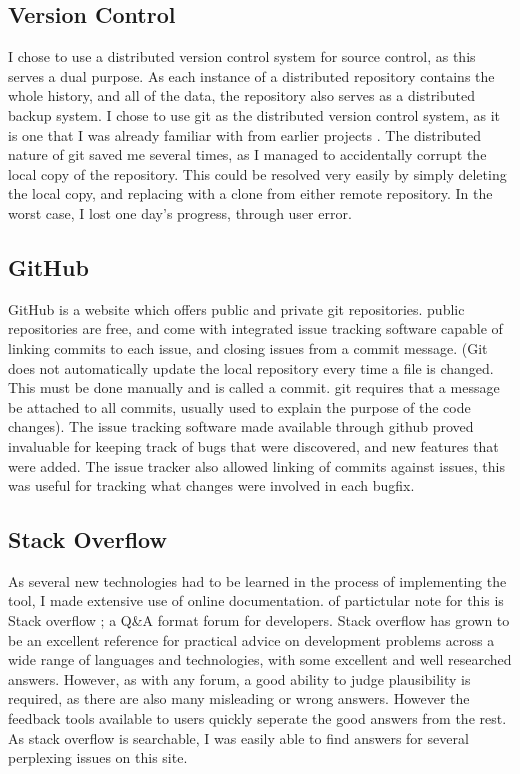 \subsection{Version Control}
I chose to use a distributed version control system for source control, as this serves a dual purpose. As each instance of a distributed repository contains the whole history, and all of the data, the repository also serves as a distributed backup system. 
I chose to use git as the distributed version control system, as it is one that I was already familiar with from earlier projects \cite{Swicegood:2008:PVC:1523278}. The distributed nature of git saved me several times, as I managed to accidentally corrupt the local copy of the repository. This could be resolved very easily by simply deleting the local copy, and replacing with a clone from either remote repository. In the worst case, I lost one day's progress, through user error.

\subsection{GitHub}
GitHub \cite{github2013} is a website which offers public and private git repositories. public repositories are free, and come with integrated issue tracking software capable of linking commits to each issue, and closing issues from a commit message. (Git does not automatically update the local repository every time a file is changed. This must be done manually and is called a commit. git requires that a message be attached to all commits, usually used to explain the purpose of the code changes). The issue tracking software made available through github proved invaluable for keeping track of bugs that were discovered, and new features that were added. The issue tracker also allowed linking of commits against issues, this was useful for tracking what changes were involved in each bugfix.

\subsection{Stack Overflow}
As several new technologies had to be learned in the process of implementing the tool, I made extensive use of online documentation. of partictular note for this is Stack overflow \cite{stack2013overflow}; a Q\&A format forum for developers. Stack overflow has grown to be an excellent reference for practical advice on development problems across a wide range of languages and technologies, with some excellent and well researched answers. However, as with any forum, a good ability to judge plausibility is required, as there are also many misleading or wrong answers. However the feedback tools available to users quickly seperate the good answers from the rest. As stack overflow is searchable, I was easily able to find answers for several perplexing issues on this site. 